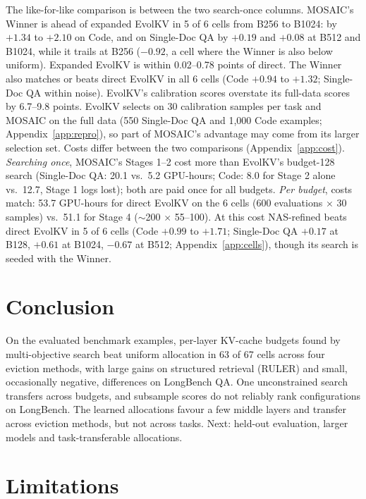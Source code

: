 \documentclass[11pt]{article}
\begin{document}
The like-for-like comparison is between the two search-once columns. MOSAIC's Winner is ahead of expanded EvolKV in 5 of 6 cells from B256 to B1024: by $+1.34$ to $+2.10$ on Code, and on Single-Doc QA by $+0.19$ and $+0.08$ at B512 and B1024, while it trails at B256 ($-0.92$, a cell where the Winner is also below uniform). Expanded EvolKV is within 0.02--0.78 points of direct. The Winner also matches or beats direct EvolKV in all 6 cells (Code $+0.94$ to $+1.32$; Single-Doc QA within noise). EvolKV's calibration scores overstate its full-data scores by 6.7--9.8 points. EvolKV selects on 30 calibration samples per task and MOSAIC on the full data (550 Single-Doc QA and 1{,}000 Code examples; Appendix~\ref{app:repro}), so part of MOSAIC's advantage may come from its larger selection set. Costs differ between the two comparisons (Appendix~\ref{app:cost}). \emph{Searching once}, MOSAIC's Stages 1--2 cost more than EvolKV's budget-128 search (Single-Doc QA: 20.1 vs.\ 5.2 GPU-hours; Code: 8.0 for Stage 2 alone vs.\ 12.7, Stage 1 logs lost); both are paid once for all budgets. \emph{Per budget}, costs match: 53.7 GPU-hours for direct EvolKV on the 6 cells (600 evaluations $\times$ 30 samples) vs.\ 51.1 for Stage 4 ($\sim$200 $\times$ 55--100). At this cost NAS-refined beats direct EvolKV in 5 of 6 cells (Code $+0.99$ to $+1.71$; Single-Doc QA $+0.17$ at B128, $+0.61$ at B1024, $-0.67$ at B512; Appendix~\ref{app:cells}), though its search is seeded with the Winner.

\section{Conclusion}

On the evaluated benchmark examples, per-layer KV-cache budgets found by multi-objective search beat uniform allocation in 63 of 67 cells across four eviction methods, with large gains on structured retrieval (RULER) and small, occasionally negative, differences on LongBench QA. One unconstrained search transfers across budgets, and subsample scores do not reliably rank configurations on LongBench. The learned allocations favour a few middle layers and transfer across eviction methods, but not across tasks. Next: held-out evaluation, larger models and task-transferable allocations.

\section*{Limitations}
\end{document}
